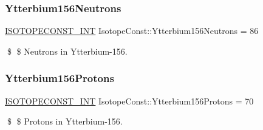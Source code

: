 \subsubsection{\texorpdfstring{Ytterbium156\+Neutrons}{Ytterbium156Neutrons}}
{\footnotesize\ttfamily \mbox{\hyperlink{group___isotope_const-_macros_ga5f18360b3e99483a35c32d789e62621c}{I\+S\+O\+T\+O\+P\+E\+C\+O\+N\+S\+T\+\_\+\+I\+NT}} Isotope\+Const\+::\+Ytterbium156\+Neutrons = 86}

\$ \$ Neutrons in Ytterbium-\/156. \mbox{\label{group___isotope_const-_ytterbium-_yb156_ga977f078f3a88b51c13a64d4ac9e9a426}} 
\subsubsection{\texorpdfstring{Ytterbium156\+Protons}{Ytterbium156Protons}}
{\footnotesize\ttfamily \mbox{\hyperlink{group___isotope_const-_macros_ga5f18360b3e99483a35c32d789e62621c}{I\+S\+O\+T\+O\+P\+E\+C\+O\+N\+S\+T\+\_\+\+I\+NT}} Isotope\+Const\+::\+Ytterbium156\+Protons = 70}

\$ \$ Protons in Ytterbium-\/156. 